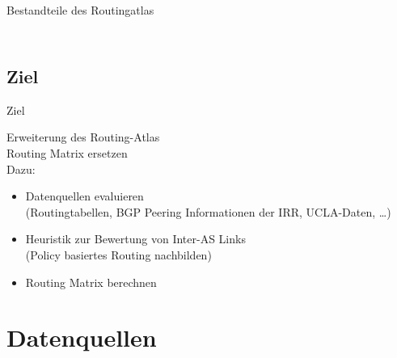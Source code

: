 \documentclass[ngerman,compress,hyperref={bookmarks}]{beamer}
\begin{document}
\begin{frame}[allowframebreaks]{Bestandteile des Routingatlas}
\begin{columns}[c]
\begin{column}{0.5\textwidth}
\begin{figure}
      \end{figure}
    \end{column}
  \end{columns}
\end{frame}



\subsection{Ziel}
\begin{frame}{Ziel}
  \begin{center}
    {\Large Erweiterung des Routing-Atlas}\\
    \vspace{0.5cm}
    Routing Matrix ersetzen\\
    \vspace{0.5cm}
    Dazu:
    \begin{itemize}
      \item Datenquellen evaluieren\\{\scriptsize(Routingtabellen, BGP Peering Informationen der IRR, UCLA-Daten, \ldots)}
      \item Heuristik zur Bewertung von Inter-AS Links\\{\scriptsize(Policy basiertes Routing nachbilden)}
      \item Routing Matrix berechnen
    \end{itemize}
  \end{center}
\end{frame}


\section{Datenquellen}
\end{document}
